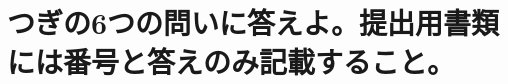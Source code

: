 \documentclass[titlepage,a4paper]{jsarticle}
\begin{document}
\section{つぎの6つの問いに答えよ。提出用書類には番号と答えのみ記載すること。}%
\begin{thebibliography}{99}
  \bibitem{}
\end{thebibliography}
\end{document}
